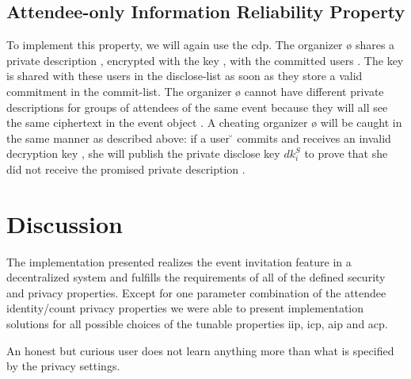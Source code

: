 

\subsection{Attendee-only Information Reliability Property}
	\label{subsection:event-invitations-dosns:air-property}
To implement this property, we will again use the \acl{cdp}. The 
organizer \o{} shares a private description \dS{}, encrypted with the key \PDK{}, 
with the committed users \C{}. The key is shared with these users in the
disclose-list as soon as they store a valid commitment \cm{} in the
commit-list.
%
The organizer \o{} cannot have different private descriptions for groups of attendees 
of the same event \e{} because they will all see the same ciphertext in the event 
object \eo{}.
%
A cheating organizer \o{} will be caught in the same manner as described 
above: if a user \u{} commits and receives an invalid decryption key \PDK{}, she 
will publish the private disclose key $dk_i^S$ to prove that she did not receive 
the promised private description \dS{}.


\section{Discussion}
	\label{section:event-invitations-dosns:discussion}

The implementation presented realizes the event invitation feature
in a decentralized system and fulfills the requirements of all of the
defined security and privacy properties. Except for one parameter
combination of the attendee identity/count privacy properties we were
able to present implementation solutions for all possible choices of the
tunable properties \Ac{iip}, \Ac{icp}, \Ac{aip} and \Ac{acp}.

An honest but curious user does not learn anything more than what is
specified by the privacy settings. 

